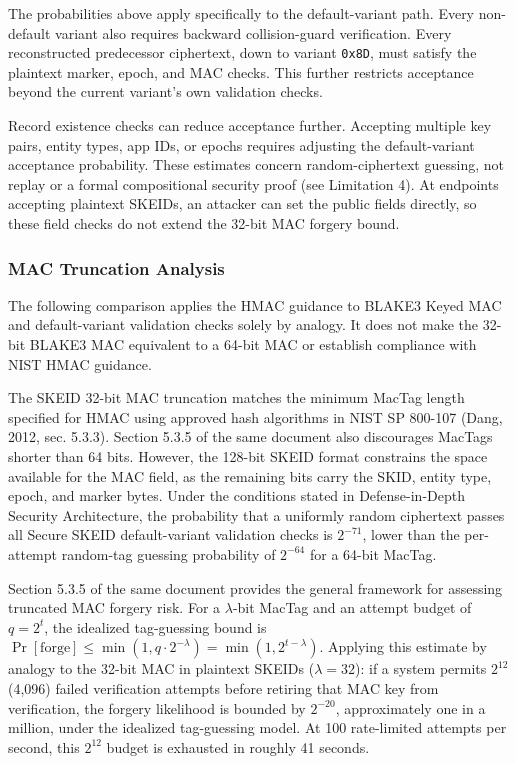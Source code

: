 \documentclass[fleqn,10pt,lineno]{wlpeerj}
\begin{document}
The probabilities above apply specifically to the default-variant path.
Every non-default variant also requires backward collision-guard
verification. Every reconstructed predecessor ciphertext, down to
variant \texttt{0x8D}, must satisfy the plaintext marker, epoch, and MAC
checks. This further restricts acceptance beyond the current variant's
own validation checks.

Record existence checks can reduce acceptance further. Accepting
multiple key pairs, entity types, app IDs, or epochs requires adjusting
the default-variant acceptance probability. These estimates concern
random-ciphertext guessing, not replay or a formal compositional
security proof (see Limitation 4). At endpoints accepting plaintext
SKEIDs, an attacker can set the public fields directly, so these field
checks do not extend the 32-bit MAC forgery bound.

\subsubsection{MAC Truncation Analysis}\label{mac-truncation-analysis}

The following comparison applies the HMAC guidance to BLAKE3 Keyed MAC
and default-variant validation checks solely by analogy. It does not
make the 32-bit BLAKE3 MAC equivalent to a 64-bit MAC or establish
compliance with NIST HMAC guidance.

The SKEID 32-bit MAC truncation matches the minimum MacTag length
specified for HMAC using approved hash algorithms in NIST SP 800-107
(Dang, 2012, sec. 5.3.3). Section 5.3.5 of the same document also
discourages MacTags shorter than 64 bits. However, the 128-bit SKEID
format constrains the space available for the MAC field, as the
remaining bits carry the SKID, entity type, epoch, and marker bytes.
Under the conditions stated in Defense-in-Depth Security Architecture,
the probability that a uniformly random ciphertext passes all Secure
SKEID default-variant validation checks is \(2^{-71}\), lower than the
per-attempt random-tag guessing probability of \(2^{-64}\) for a 64-bit
MacTag.

Section 5.3.5 of the same document provides the general framework for
assessing truncated MAC forgery risk. For a \(\lambda\)-bit MacTag and
an attempt budget of \(q = 2^t\), the idealized tag-guessing bound is
\(\Pr[\mathrm{forge}] \leq \min(1, q \cdot 2^{-\lambda}) = \min(1, 2^{t-\lambda})\).
Applying this estimate by analogy to the 32-bit MAC in plaintext SKEIDs
(\(\lambda = 32\)): if a system permits \(2^{12}\) (4,096) failed
verification attempts before retiring that MAC key from verification,
the forgery likelihood is bounded by \(2^{-20}\), approximately one in a
million, under the idealized tag-guessing model. At 100 rate-limited
attempts per second, this \(2^{12}\) budget is exhausted in roughly 41
seconds.
\end{document}
